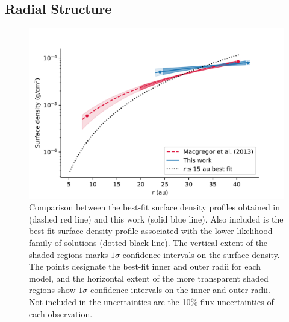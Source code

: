 \documentclass[modern]{aastex62}
\begin{document}
\subsection{Radial Structure}
\label{subsection: radial discussion}

\begin{figure}
  \includegraphics[width=\linewidth]{../figures/surface_density}
  \caption{
    Comparison between the best-fit surface density profiles obtained in \citet{macgregor13} (dashed red line) and this work (solid blue line).
    Also included is the best-fit surface density profile associated with the lower-likelihood family of solutions (dotted black line).
    The vertical extent of the shaded regions marks $1\sigma$ confidence intervals on the surface density. 
    The points designate the best-fit inner and outer radii for each model, and the horizontal extent of the more transparent shaded regions show $1 \sigma$ confidence intervals on the inner and outer radii.
    Not included in the uncertainties are the 10\% flux uncertainties of each observation.
    }
  \label{fig surface_density}
\end{figure}
\end{document}
